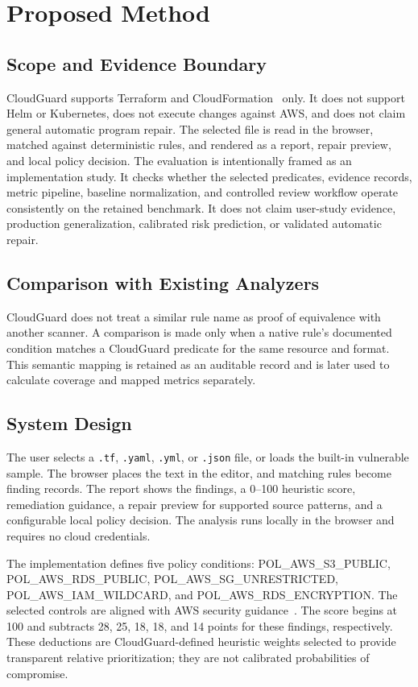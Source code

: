 \documentclass[conference]{IEEEtran}
\begin{document}
\section{Proposed Method}
\subsection{Scope and Evidence Boundary}
CloudGuard supports Terraform and CloudFormation~\cite{terraform,cloudformation} only. It does not support Helm or Kubernetes, does not execute changes against AWS, and does not claim general automatic program repair. The selected file is read in the browser, matched against deterministic rules, and rendered as a report, repair preview, and local policy decision.
The evaluation is intentionally framed as an implementation study. It checks whether the selected predicates, evidence records, metric pipeline, baseline normalization, and controlled review workflow operate consistently on the retained benchmark. It does not claim user-study evidence, production generalization, calibrated risk prediction, or validated automatic repair.

\subsection{Comparison with Existing Analyzers}
CloudGuard does not treat a similar rule name as proof of equivalence with another scanner. A comparison is made only when a native rule's documented condition matches a CloudGuard predicate for the same resource and format. This semantic mapping is retained as an auditable record and is later used to calculate coverage and mapped metrics separately.

\subsection{System Design}
The user selects a \texttt{.tf}, \texttt{.yaml}, \texttt{.yml}, or \texttt{.json} file, or loads the built-in vulnerable sample. The browser places the text in the editor, and matching rules become finding records. The report shows the findings, a 0--100 heuristic score, remediation guidance, a repair preview for supported source patterns, and a configurable local policy decision. The analysis runs locally in the browser and requires no cloud credentials.

The implementation defines five policy conditions: POL\_AWS\_S3\_PUBLIC, POL\_AWS\_RDS\_PUBLIC, POL\_AWS\_SG\_UNRESTRICTED, POL\_AWS\_IAM\_WILDCARD, and POL\_AWS\_RDS\_ENCRYPTION. The selected controls are aligned with AWS security guidance~\cite{awswell,s3public,rdsnetwork,sg-rules,iam-action}. The score begins at 100 and subtracts 28, 25, 18, 18, and 14 points for these findings, respectively. These deductions are CloudGuard-defined heuristic weights selected to provide transparent relative prioritization; they are not calibrated probabilities of compromise.
\end{document}
